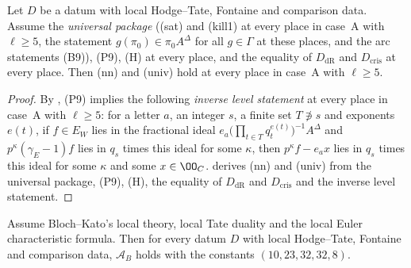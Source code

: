 \begin{proposition}\label{pf:linkN-adm:univ}
Let $D$ be a datum with local Hodge--Tate, Fontaine and comparison data. Assume the \emph{universal package} ((sat) and
(kill1) at every place in case~A with $\ell\ge5$, the statement $g(\pi_0)\in\pi_0A^\Delta$ for all $g\in\Gamma$ at these
places, and the arc statements (B9)), (P9),
(H) at every place, and the equality of $D_{\mathrm{dR}}$ and $D_{\mathrm{cris}}$ at every place. Then (nn) and (univ)
hold at every place in case~A with $\ell\ge5$.
\end{proposition}

\begin{proof}
By , (P9) implies the following \emph{inverse level statement}
at every place in case~A with $\ell\ge5$: for a letter $a$, an integer $s$, a finite set $T\not\ni s$ and exponents
$e(t)$, if $f\in E_W$ lies in the fractional ideal $e_a\bigl(\prod_{t\in T}q_t^{e(t)}\bigr)^{-1}A^\Delta$ and
$p^\kappa(\gamma_E-1)f$ lies in $q_s$ times this ideal for some $\kappa$, then $p^\kappa f-e_ax$ lies in $q_s$ times this
ideal for some $\kappa$ and some $x\in\OO_C$. 
derives (nn) and (univ) from the universal package, (P9), (H), the equality of $D_{\mathrm{dR}}$ and $D_{\mathrm{cris}}$ and
the inverse level statement.
\end{proof}

\begin{theorem}\label{pf:linkN-adm:admB}
Assume Bloch--Kato's local theory, local Tate duality and the local Euler characteristic formula. Then for every datum $D$
with local Hodge--Tate, Fontaine and comparison data, $\mathcal A_B$ holds with the constants $(10,23,32,32,8)$.
\end{theorem}

